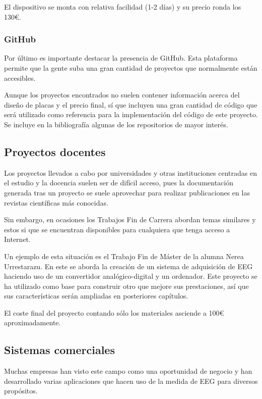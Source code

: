 El dispositivo se monta con relativa facilidad (1-2 días) y su precio ronda los 130€.

\subsubsection{GitHub}

Por último es importante destacar la presencia de GitHub. Esta plataforma permite que la gente suba una gran cantidad de proyectos que normalmente están accesibles.

Aunque los proyectos encontrados no suelen contener información acerca del diseño de placas y el precio final, sí que incluyen una gran cantidad de código que será utilizado como referencia para la implementación del código de este proyecto. Se incluye en la bibliografía algunas de los repositorios de mayor interés.

\subsection{Proyectos docentes\label{sec:Pro_docentes}}

Los proyectos llevados a cabo por universidades y otras instituciones centradas en el estudio y la docencia suelen ser de difícil acceso, pues la documentación generada tras un proyecto se suele aprovechar para realizar publicaciones en las revistas científicas más conocidas.

Sin embargo, en ocasiones los Trabajos Fin de Carrera abordan temas similares y estos si que se encuentran disponibles para cualquiera que tenga acceso a Internet. 

Un ejemplo de esta situación es el Trabajo Fin de Máster de la alumna Nerea Urrestarazu. En este se aborda la creación de un sistema de adquisición de EEG haciendo uso de un convertidor analógico-digital y un ordenador. Este proyecto se ha utilizado como base para construir otro que mejore sus prestaciones, así que sus características serán ampliadas en posteriores capítulos.

El coste final del proyecto contando sólo los materiales asciende a 100€ aproximadamente.

\subsection{Sistemas comerciales\label{sec:Pro_empresa}}

Muchas empresas han visto este campo como una oportunidad de negocio y han desarrollado varias aplicaciones que hacen uso de la medida de EEG para diversos propósitos.

